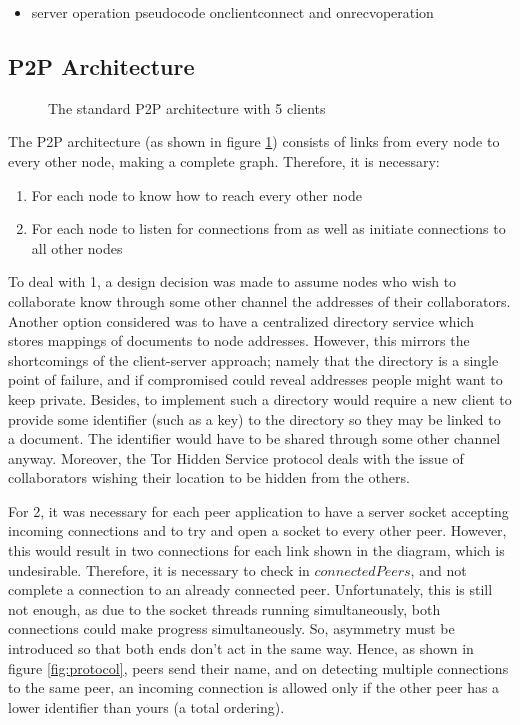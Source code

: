 \documentclass[diss.tex]{subfiles}
\begin{document}
\begin{itemize}

\item server operation pseudocode onclientconnect and onrecvoperation

\end{itemize}
\subsection{P2P Architecture}

\begin{figure}[H]
\centering
{}
\caption{The standard P2P architecture with 5 clients}
\label{fig:p2p}
\end{figure}

The P2P architecture (as shown in figure \ref{fig:p2p}) consists of links from every node to every other node, making a complete graph. Therefore, it is necessary:
\begin{enumerate}
	\item For each node to know how to reach every other node
	\item For each node to listen for connections from as well as initiate connections to all other nodes
\end{enumerate}
To deal with 1, a design decision was made to assume nodes who wish to collaborate know through some other channel the addresses of their collaborators. Another option considered was to have a centralized directory service which stores mappings of documents to node addresses. However, this mirrors the shortcomings of the client-server approach; namely that the directory is a single point of failure, and if compromised could reveal addresses people might want to keep private. Besides, to implement such a directory would require a new client to provide some identifier (such as a key) to the directory so they may be linked to a document. The identifier would have to be shared through some other channel anyway. Moreover, the Tor Hidden Service protocol deals with the issue of collaborators wishing their location to be hidden from the others.

For 2, it was necessary for each peer application to have a server socket accepting incoming connections and to try and open a socket to every other peer. However, this would result in two connections for each link shown in the diagram, which is undesirable. Therefore, it is necessary to check in $connectedPeers$, and not complete a connection to an already connected peer. Unfortunately, this is still not enough, as due to the socket threads running simultaneously, both connections could make progress simultaneously. So, asymmetry must be introduced so that both ends don't act in the same way. Hence, as shown in figure \ref{fig:protocol}, peers send their name, and on detecting multiple connections to the same peer, an incoming connection is allowed only if the other peer has a lower identifier than yours (a total ordering).
\end{document}
